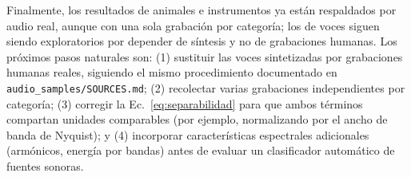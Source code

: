 Finalmente, los resultados de animales e instrumentos ya están respaldados por audio real, aunque con una sola grabación por categoría; los de voces siguen siendo exploratorios por depender de síntesis y no de grabaciones humanas. Los próximos pasos naturales son: (1) sustituir las voces sintetizadas por grabaciones humanas reales, siguiendo el mismo procedimiento documentado en \texttt{audio\_samples/SOURCES.md}; (2) recolectar varias grabaciones independientes por categoría; (3) corregir la Ec.~\ref{eq:separabilidad} para que ambos términos compartan unidades comparables (por ejemplo, normalizando por el ancho de banda de Nyquist); y (4) incorporar características espectrales adicionales (armónicos, energía por bandas) antes de evaluar un clasificador automático de fuentes sonoras.
